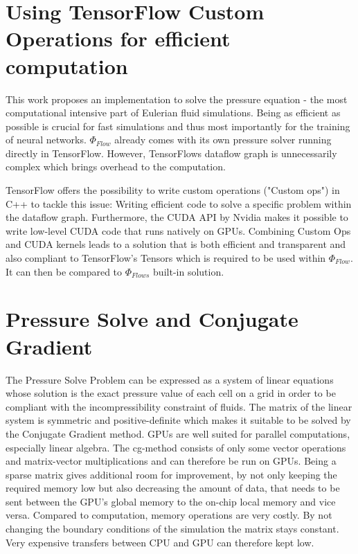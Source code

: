 \section{Using TensorFlow Custom Operations for efficient computation}
This work proposes an implementation to solve the pressure equation - the most computational intensive part of Eulerian fluid simulations. Being as efficient as possible is crucial for fast simulations and thus most importantly for the training of neural networks. $\Phi_\textit{Flow}$ already comes with its own pressure solver running directly in TensorFlow. However, TensorFlows dataflow graph is unnecessarily complex which brings overhead to the computation.
\par TensorFlow offers the possibility to write custom operations ("Custom ops") in C++ to tackle this issue: Writing efficient code to solve a specific problem within the dataflow graph. Furthermore, the CUDA API by Nvidia makes it possible to write low-level CUDA code that runs natively on GPUs. Combining Custom Ops and CUDA kernels leads to a solution that is both efficient and transparent and also compliant to TensorFlow's Tensors which is required to be used within $\Phi_\textit{Flow}$. It can then be compared to $\Phi_\textit{Flows}$ built-in solution.
\section{Pressure Solve and Conjugate Gradient}
The Pressure Solve Problem can be expressed as a system of linear equations whose solution is the exact pressure value of each cell on a grid in order to be compliant with the incompressibility constraint of fluids. The matrix of the linear system is symmetric and positive-definite which makes it suitable to be solved by the Conjugate Gradient method. GPUs are well suited for parallel computations, especially linear algebra. The cg-method consists of only some vector operations and matrix-vector multiplications and can therefore be run on GPUs. Being a sparse matrix gives additional room for improvement, by not only keeping the required memory low but also decreasing the amount of data, that needs to be sent between the GPU's global memory to the on-chip local memory and vice versa. Compared to computation, memory operations are very costly. By not changing the boundary conditions of the simulation the matrix stays constant. Very expensive transfers between CPU and GPU can therefore kept low.